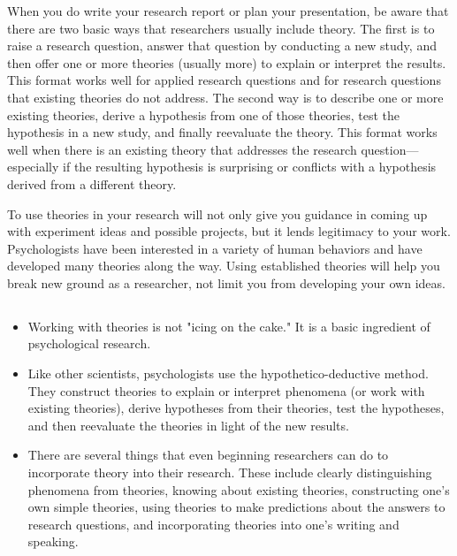 When you do write your research report or plan your presentation, be aware that there are two basic ways that researchers usually include theory. The first is to raise a research question, answer that question by conducting a new study, and then offer one or more theories (usually more) to explain or interpret the results. This format works well for applied research questions and for research questions that existing theories do not address. The second way is to describe one or more existing theories, derive a hypothesis from one of those theories, test the hypothesis in a new study, and finally reevaluate the theory. This format works well when there is an existing theory that addresses the research question---especially if the resulting hypothesis is surprising or conflicts with a hypothesis derived from a different theory.

To use theories in your research will not only give you guidance in coming up with experiment ideas and possible projects, but it lends legitimacy to your work. Psychologists have been interested in a variety of human behaviors and have developed many theories along the way. Using established theories will help you break new ground as a researcher, not limit you from developing your own ideas.


\subsection{}

\begin{fullwidth}

\begin{itemize}

\item  Working with theories is not "icing on the cake." It is a basic ingredient of psychological research.

\item Like other scientists, psychologists use the hypothetico-deductive method. They construct theories to explain or interpret phenomena (or work with existing theories), derive hypotheses from their theories, test the hypotheses, and then reevaluate the theories in light of the new results.

\item There are several things that even beginning researchers can do to incorporate theory into their
research. These include clearly distinguishing phenomena from theories, knowing about existing theories, constructing one's own simple theories, using theories to make predictions about the answers to research questions, and incorporating theories into one's writing and speaking.

\end{itemize}

\end{fullwidth}


